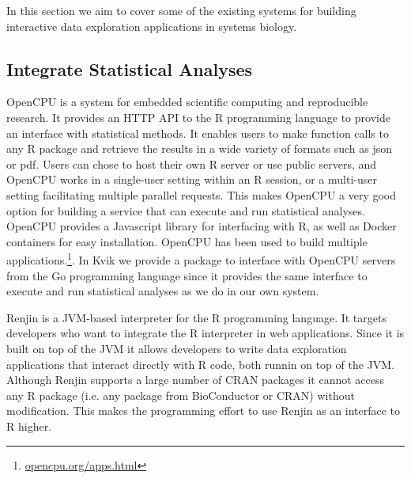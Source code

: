 In this section we aim to cover some of the existing systems for building
interactive data exploration applications in systems biology. 



\subsection*{Integrate Statistical Analyses} 
OpenCPU is a system for embedded scientific computing and reproducible
research.\cite{opencpu} It provides an HTTP API to the R programming language to
provide an interface with statistical methods. It enables users to make function
calls to any R package and retrieve the results in a wide variety of formats
such as json or pdf. 
Users can chose to host their own R server or use public servers, and OpenCPU
works in a single-user setting within an R session, or a multi-user setting
facilitating multiple parallel requests. This makes OpenCPU a very good option
for building a service that can execute and run statistical analyses. 
OpenCPU provides a Javascript library for interfacing with R, as well as Docker
containers for easy installation. OpenCPU has been used to build multiple
applications.\footnote{\url{opencpu.org/apps.html}}.
In Kvik we provide a package
to interface with OpenCPU servers from the Go programming language since it
provides the same interface to execute and run statistical analyses as we do in
our own system. 

Renjin is a JVM-based interpreter for the R programming language.\cite{renjin}
It targets developers who want to integrate the R interpreter in web
applications. Since it is built on top of the JVM it allows developers to write
data exploration applications that interact directly with R code, both runnin on
top of the JVM. Although Renjin supports a large number of CRAN packages it
cannot access any R package (i.e.  any package from BioConductor or CRAN)
without modification. This makes the programming effort to use Renjin as an
interface to R higher. 

